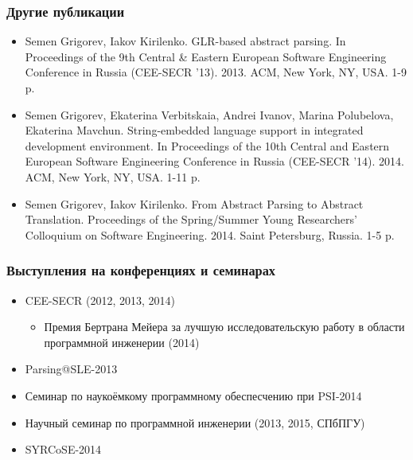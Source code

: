 \documentclass{beamer}
\begin{document}
\begin{frame}
    \transwipe[direction=90]
    \frametitle{Другие публикации}
  \begin{itemize}
          \item Semen Grigorev, Iakov Kirilenko. GLR-based abstract parsing. In Proceedings of the 9th Central \& Eastern European Software Engineering Conference in Russia (CEE-SECR ’13). 2013. ACM, New York, NY, USA. 1-9 p.
          \item Semen Grigorev, Ekaterina Verbitskaia, Andrei Ivanov, Marina Polubelova, Ekaterina Mavchun. String-embedded language support in integrated development environment. In Proceedings of the 10th Central and Eastern European Software Engineering Conference in Russia (CEE-SECR '14). 2014. ACM, New York, NY, USA. 1-11 p.
          \item Semen Grigorev, Iakov Kirilenko. From Abstract Parsing to Abstract Translation. Proceedings of the Spring/Summer Young Researchers' Colloquium on Software Engineering. 2014. Saint Petersburg, Russia. 1-5 p.
  \end{itemize} 
\end{frame}

\begin{frame}
    \transwipe[direction=90]
    \frametitle{Выступления на конференциях и семинарах}
  \begin{itemize}
          \item CEE-SECR (2012, 2013, 2014)
          \begin{itemize}
              \item Премия Бертрана Мейера за лучшую исследовательскую работу в области программной 
инженерии (2014)
          \end{itemize} 
          \item Parsing@SLE-2013
          \item Семинар по наукоёмкому программному обеспесчению при PSI-2014
          \item Научный семинар по программной инженерии (2013, 2015, СПбПГУ)
          \item SYRCoSE-2014
  \end{itemize} 
\end{frame}
\end{document}
